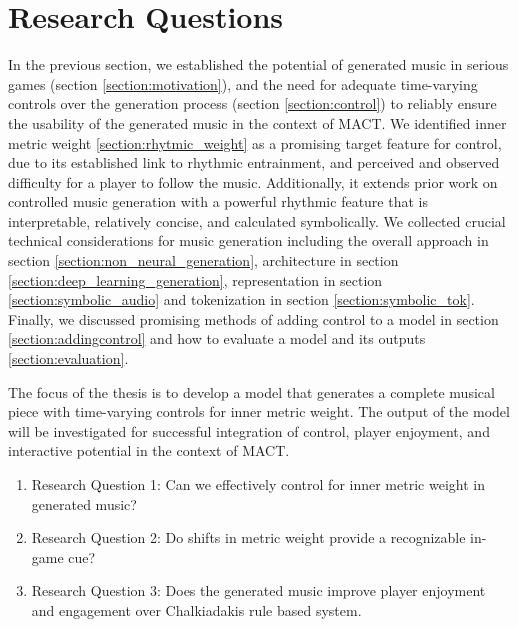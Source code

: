 

\chapter{Research Questions}
\label{chap:researchquestions}
\pagestyle{fancy}

In the previous section, we established the potential of generated music in serious games (section \ref{section:motivation}), and the need for adequate time-varying controls over the generation process (section \ref{section:control}) to reliably ensure the usability of the generated music in the context of MACT. We identified inner metric weight \ref{section:rhytmic_weight} as a promising target feature for control, due to its established link to rhythmic entrainment, and perceived and observed difficulty for a player to follow the music. Additionally, it extends prior work on controlled music generation with a powerful rhythmic feature that is interpretable, relatively concise, and calculated symbolically. 
We collected crucial technical considerations for music generation including the overall approach in section \ref{section:non_neural_generation}, architecture in section \ref{section:deep_learning_generation}, representation in section \ref{section:symbolic_audio} and tokenization in section \ref{section:symbolic_tok}. Finally, we discussed promising methods of adding control to a model in section \ref{section:addingcontrol} and how to evaluate a model and its outputs \ref{section:evaluation}. 

The focus of the thesis is to develop a model that generates a complete musical piece with time-varying controls for inner metric weight. The output of the model will be investigated for successful integration of control, player enjoyment, and interactive potential in the context of MACT. 
  
\begin{enumerate}
\item{Research Question 1}: Can we effectively control for inner metric weight in generated music?

\item{Research Question 2}: Do shifts in metric weight provide a recognizable in-game cue?

\item {Research Question 3}: Does the generated music improve player enjoyment and engagement over Chalkiadakis\cite{Chalkiadakis_2022} rule based system. 
\end{enumerate}


